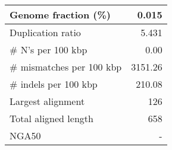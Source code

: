 \documentclass[12pt,a4paper]{article}
\begin{document}
\begin{table}[ht]
\begin{center}
\begin{tabular}{|l*{1}{|r}|}
Genome fraction (\%) & 0.015 \\ \hline
Duplication ratio & 5.431 \\ \hline
\# N's per 100 kbp & 0.00 \\ \hline
\# mismatches per 100 kbp & 3151.26 \\ \hline
\# indels per 100 kbp & 210.08 \\ \hline
Largest alignment & 126 \\ \hline
Total aligned length & 658 \\ \hline
NGA50 & - \\ \hline
\end{tabular}
\end{center}
\end{table}
\end{document}
